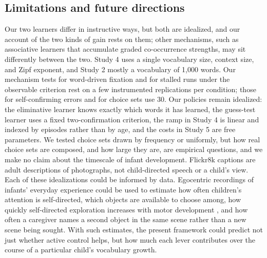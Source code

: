 \documentclass[a4paper,natbib,man]{apa6}
\begin{document}
\subsection{Limitations and future directions}
Our two learners differ in instructive ways, but both are idealized, and our account of the two kinds of gain rests on them; other mechanisms, such as associative learners that accumulate graded co-occurrence strengths, may sit differently between the two. Study 4 uses a single vocabulary size, context size, and Zipf exponent, and Study 2 mostly a vocabulary of 1,000 words. Our mechanism tests for word-driven fixation and for stalled runs under the observable criterion rest on a few instrumented replications per condition; those for self-confirming errors and for choice sets use 30. Our policies remain idealized: the eliminative learner knows exactly which words it has learned, the guess-test learner uses a fixed two-confirmation criterion, the ramp in Study 4 is linear and indexed by episodes rather than by age, and the costs in Study 5 are free parameters. We tested choice sets drawn by frequency or uniformly, but how real choice sets are composed, and how large they are, are empirical questions, and we make no claim about the timescale of infant development. Flickr8k captions are adult descriptions of photographs, not child-directed speech or a child's view. Each of these idealizations could be informed by data. Egocentric recordings of infants' everyday experience \citep{Sullivan:2021,Clerkin:2017} could be used to estimate how often children's attention is self-directed, which objects are available to choose among, how quickly self-directed exploration increases with motor development \citep{Kretch:2014}, and how often a caregiver names a second object in the same scene rather than a new scene being sought. With such estimates, the present framework could predict not just whether active control helps, but how much each lever contributes over the course of a particular child's vocabulary growth.


\setlength{\bibleftmargin}{.125in}
\setlength{\bibindent}{-\bibleftmargin}

\end{document}
